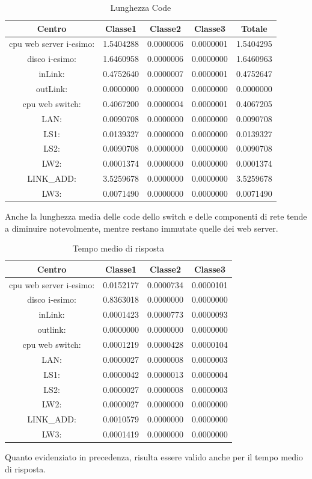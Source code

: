 \begin{table}[htbp]
\begin{center}
\begin{tabular}{|c|c|c|c|c|}
\hline
Centro &Classe1 &Classe2 &Classe3 &Totale\\
\hline
\hline
 cpu web server i-esimo: 	&1.5404288	&0.0000006	&0.0000001	&1.5404295\\
\hline
 disco i-esimo: 	&1.6460958	&0.0000006	&0.0000000	&1.6460963\\
\hline
 inLink: 	&0.4752640	&0.0000007	&0.0000001	&0.4752647\\
\hline
 outLink: 	&0.0000000	&0.0000000	&0.0000000	&0.0000000\\
\hline
 cpu web switch: 	&0.4067200	&0.0000004	&0.0000001	&0.4067205\\
\hline
 LAN: 	&0.0090708	&0.0000000	&0.0000000	&0.0090708\\
\hline
 LS1: 	&0.0139327	&0.0000000	&0.0000000	&0.0139327\\
\hline
 LS2: 	&0.0090708	&0.0000000	&0.0000000	&0.0090708\\
\hline
 LW2: 	&0.0001374	&0.0000000	&0.0000000	&0.0001374\\
\hline
 LINK\_ADD: 	&3.5259678	&0.0000000	&0.0000000	&3.5259678\\
\hline
 LW3: 	&0.0071490	&0.0000000	&0.0000000	&0.0071490\\
\hline
\end{tabular}
\end{center}
\caption{Lunghezza Code}
\label{lunghezzacode}
\end{table}
Anche la lunghezza media delle code dello switch e delle componenti di rete tende a diminuire notevolmente, mentre restano immutate quelle dei web server.
\begin{table}[htbp]
\begin{center}
\begin{tabular}{|c|c|c|c|}
\hline
Centro &Classe1 &Classe2 &Classe3\\
\hline
\hline
 cpu web server i-esimo: 	&0.0152177	&0.0000734	&0.0000101\\
\hline
 disco i-esimo: 	&0.8363018	&0.0000000	&0.0000000\\
\hline
 inLink: 	&0.0001423	&0.0000773	&0.0000093\\
\hline
 outlink: 	&0.0000000	&0.0000000	&0.0000000\\
\hline
 cpu web switch: 	&0.0001219	&0.0000428	&0.0000104\\
\hline
 LAN: 	&0.0000027	&0.0000008	&0.0000003\\
\hline
 LS1: 	&0.0000042	&0.0000013	&0.0000004\\
\hline
 LS2: 	&0.0000027	&0.0000008	&0.0000003\\
\hline
 LW2: 	&0.0000027	&0.0000000	&0.0000000\\
\hline
 LINK\_ADD: 	&0.0010579	&0.0000000	&0.0000000\\
\hline
 LW3: 	&0.0001419	&0.0000000	&0.0000000\\
\hline
\end{tabular}
\end{center}
\caption{Tempo medio di risposta}
\label{tempomediodirisposta}
\end{table}
Quanto evidenziato in precedenza, risulta essere valido anche per il tempo medio di risposta.
